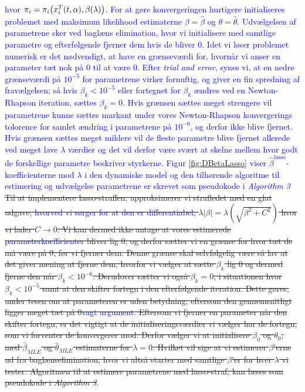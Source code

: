 \documentclass[11pt,a4paper]{article}
\begin{document}
\textcolor{blue}{hvor $\pi_i=\pi_i\big{(}x_i^T(t,\alpha),\beta(\lambda)\big{)}$. For at gøre konvergeringen hurtigere initialiseres problemet med maksimum likelihood estimaterne $\beta=\hat{\beta}$ og $\theta=\hat{\theta}$. Udvælgelsen af parametrene sker ved baglæns elimination, hvor vi initialisere med samtlige parametre og efterfølgende fjerner dem hvis de bliver 0. Idet vi løser problemet numerisk er det nødvendigt, at have en grænseværdi for, hvornår vi anser en parameter tæt nok på 0 til at være 0. Efter \textit{trial and error}, synes vi, at en nedre grænseværdi på $10^{-5}$ for parametrene virker fornuftig, og giver en fin spredning af fravælgelsen; så hvis $\beta_k<10^{-5}$ eller fortegnet for $\beta_k$ ændres ved en Newton-Rhapson iteration, sættes $\beta_k=0$. Hvis grænsen sættes meget strengere vil parametrene kunne sættes markant under vores Newton-Rhapson konvergerings tolorence for samlet ændring i parametrene på $10^{-6}$, og derfor ikke blive fjernet. Hvis grænsen sættes meget mildere vil de fleste parametre blive fjernet allerede ved meget lave $\lambda$ værdier og det vil derfor være svært at skelne mellem hvor godt de forskellige parametre beskriver styrkerne. Figur \ref{fig:DBetaLasso} viser $\hat{\beta}^{\text{lasso}}$-koefficienterne mod $\lambda$ i den dynamiske model og den tilhørende algoritme til estimering og udvælgelse parametrene er skrevet som pseudokode i \textit{Algorithm 3}}\\
\sout{Til at implementere lasso-straffen, approksimerer vi strafledet med en glat udgave, \textcolor{blue}{hvorved vi sørger for at den er differentiabel}, $\lambda |\beta| = \lambda(\sqrt{\beta^2+C^2})$ hvor vi lader $C\rightarrow 0$. Vi kan dermed ikke antage at vores estimerede \textcolor{blue}{parameterkoefficienter} bliver lig 0, og derfor sætter vi en grænse for hvor tæt de må være på 0, før vi fjerner dem. Denne grænse skal selvfølgelig være så lav at det giver mening at fjerne dem, hvorfor vi vælger at sætte $\beta_k$ lig 0 og dermed fjerne den når $\beta_k<10^{-6}$. Derudover sætter vi også $\beta_k = 0$, i situationen hvor $\beta_k<10^{-5}$ samt at den skifter fortegn i den efterfølgende iteration. Dette gøres, under tesen om at parameteren er uden betydning, eftersom den gennemsnitligt ligger meget tæt på 0\textcolor{blue}{vagt argument}. Eftersom vi fjerner en parameter når den skifter fortegn, er det vigtigt at de initialiseringsværdier vi vælger har de fortegn, som vi forventer de konvergerer mod. Derfor vælger vi at initialisere $\beta_0$ og $\theta_0$, med $\hat{\beta}_{MLE}$ og $\hat{\theta}_{MLE}$ estimaterne for $\lambda=0$. Hvilket vil sige at vi estimerer $\beta$'erne ud fra baglænselimination, hvor vi altså starter med samtlige $\beta$'er for hver $\lambda$ vi tester.
Algoritmen til at estimere parametrene med lasso-straf, kan læses som pseudokode i \textit{Algorithm 3}}.\\
\end{document}
